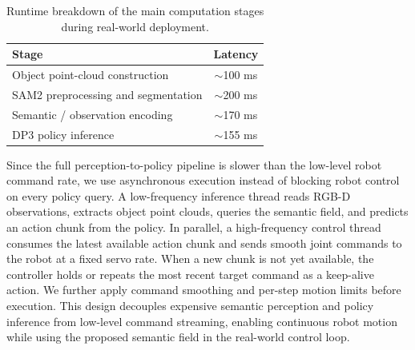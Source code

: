 \begin{table}[h]
\centering
\small
\caption{Runtime breakdown of the main computation stages during real-world deployment.}
\label{tab:runtime_breakdown}
\begin{tabular}{@{}lc@{}}
\toprule
Stage & Latency \\
\midrule
Object point-cloud construction & $\sim$100 ms \\
SAM2 preprocessing and segmentation & $\sim$200 ms \\
Semantic / observation encoding & $\sim$170 ms \\
DP3 policy inference & $\sim$155 ms \\
\bottomrule
\end{tabular}
\end{table}

Since the full perception-to-policy pipeline is slower than the low-level robot command rate, we use asynchronous execution instead of blocking robot control on every policy query. A low-frequency inference thread reads RGB-D observations, extracts object point clouds, queries the semantic field, and predicts an action chunk from the policy. In parallel, a high-frequency control thread consumes the latest available action chunk and sends smooth joint commands to the robot at a fixed servo rate. When a new chunk is not yet available, the controller holds or repeats the most recent target command as a keep-alive action. We further apply command smoothing and per-step motion limits before execution. This design decouples expensive semantic perception and policy inference from low-level command streaming, enabling continuous robot motion while using the proposed semantic field in the real-world control loop.
